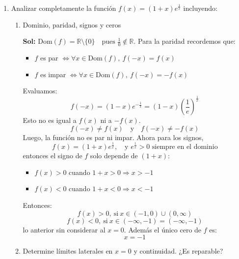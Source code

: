 \documentclass[letterpaper,12pt]{article}
\theoremstyle{plain}
\theoremstyle{definition}
\newcommand{\R}{\mathbb{R}}
\begin{document}
\begin{enumerate}
\begin{enumerate}
\[
= \lim_{x\to\infty} 
\frac{(\sqrt{x^{2}+1}-x)(\sqrt{x^{2}+1}+x)}{\sqrt{x^{2}+1}+x}
\]

\[
= \lim_{x\to\infty} 
\frac{x^{2}+1 - x^{2}}{\sqrt{x^{2}+1}+x}
= \lim_{x\to\infty} \frac{1}{\sqrt{x^{2}+1}+x} \cdot \frac{1/x}{1/x}.
\]
\[
= \lim_{x\to\infty} 
\frac{1/x}{\sqrt{1+\frac{1}{x^{2}}}+1}
= 0.
\]

\color{black}
\end{enumerate}

\item Analizar completamente la función \( f(x) = (1 + x)e^{\frac{1}{x}} \) incluyendo:
\begin{enumerate}
        \item Dominio, paridad, signos y ceros

        \color{blue}
\textbf{Sol:} 
    $\text{Dom}(f) = \mathbb{R} \setminus \{0\} \quad \text{pues } \frac{1}{0} \notin \R$. Para la paridad recordemos que:
    \begin{itemize}
        \item \( f \) es par \( \Leftrightarrow \forall x \in \text{Dom}(f),\  f(-x)=f(x) \)
        \item \( f \) es impar \( \Leftrightarrow \forall x \in \text{Dom}(f),\ f(-x)=-f(x) \)
    \end{itemize}
    Evaluamos:
    \[
    f(-x) = (1 - x) e^{-\frac{1}{x}} = (1 - x) \left( \frac{1}{e} \right)^{\frac{1}{x}}
    \]
    Esto no es igual a \( f(x) \) ni a \( -f(x) \). 
    \[
    f(-x) \neq f(x) \quad \text{y} \quad f(-x) \neq -f(x)
    \]
    Luego, la función no es par ni impar. Ahora para los signos,
    \[
    f(x) = (1 + x) e^{\frac{1}{x}}, \quad \text{y } e^{\frac{1}{x}} > 0 \text{ siempre en el dominio}
    \]
    entonces el signo de $f$ solo depende de \( (1 + x) \):
    \begin{itemize}
        \item \( f(x) > 0 \) cuando \( 1 + x > 0 \Rightarrow x > -1 \)
        \item \( f(x) < 0 \) cuando \( 1 + x < 0 \Rightarrow x < -1 \)
    \end{itemize}
    Entonces:
    \[
    f(x) > 0, \ \text{si} \ x\in (-1, 0) \cup (0, \infty)
    \]
    \[
    f(x) < 0, \ \text{si} \ x \in (-\infty, -1) = (-\infty, -1)
    \]
    lo anterior sin considerar al $x=0$. Además el único cero de $f$ es:
    \[
x = -1
    \]
\color{black}

        \item Determine límites laterales en \( x = 0 \) y continuidad. ¿Es reparable?


\end{enumerate}
\end{enumerate}
\end{document}
